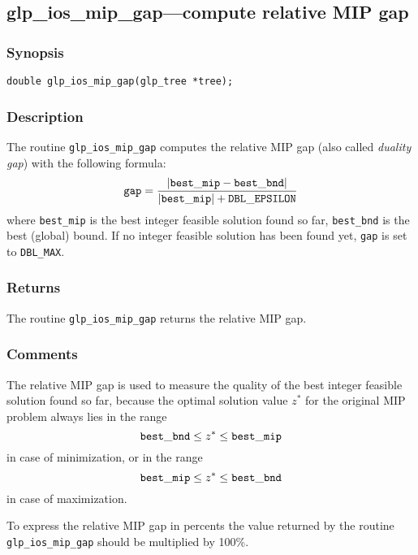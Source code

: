 \newpage

\subsection{glp\_ios\_mip\_gap---compute relative MIP gap}

\subsubsection*{Synopsis}

\begin{verbatim}
double glp_ios_mip_gap(glp_tree *tree);
\end{verbatim}

\subsubsection*{Description}

The routine \verb|glp_ios_mip_gap| computes the relative MIP gap (also
called {\it duality gap}) with the following formula:
$${\tt gap} = \frac{|{\tt best\_mip} - {\tt best\_bnd}|}
{|{\tt best\_mip}| + {\tt DBL\_EPSILON}}$$
where \verb|best_mip| is the best integer feasible solution found so
far, \verb|best_bnd| is the best (global) bound. If no integer feasible
solution has been found yet, \verb|gap| is set to \verb|DBL_MAX|.

\subsubsection*{Returns}

The routine \verb|glp_ios_mip_gap| returns the relative MIP gap.

\subsubsection*{Comments}

The relative MIP gap is used to measure the quality of the best integer
feasible solution found so far, because the optimal solution value
$z^*$ for the original MIP problem always lies in the range
$${\tt best\_bnd}\leq z^*\leq{\tt best\_mip}$$
in case of minimization, or in the range
$${\tt best\_mip}\leq z^*\leq{\tt best\_bnd}$$
in case of maximization.

To express the relative MIP gap in percents the value returned by the
routine \verb|glp_ios_mip_gap| should be multiplied by 100\%.

\newpage

